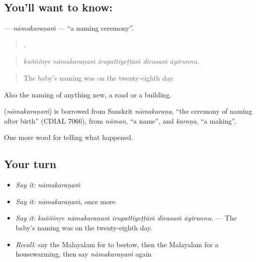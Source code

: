 \subsection*{You'll want to know: }
\textbf{} — \emph{nāmakaraṇaṁ} — \textquotedblleft{}a naming ceremony\textquotedblright{}.

\begin{quote}
    .
\end{quote}

\begin{quote}
\emph{kuññinṟe nāmakaraṇaṁ irupattiyeṭṭāṁ divasaṁ āyirunnu.}
\end{quote}

\begin{quote}
The baby's naming was on the twenty-eighth day.
\end{quote}

Also the naming of anything new, a road or a building.

\begin{cousinweb}
\textbf{} (\emph{nāmakaraṇaṁ}) is borrowed from Sanskrit \emph{nāmakaraṇa}, \textquotedblleft{}the ceremony of naming after birth\textquotedblright{} (CDIAL 7066), from \emph{nāman}, \textquotedblleft{}a name\textquotedblright{}, and \emph{karaṇa}, \textquotedblleft{}a making\textquotedblright{}.
\end{cousinweb}

\begin{grammarlens}[title={What you've built}]
One more word for telling what happened.
\end{grammarlens}

\subsection*{Your turn}
\begin{itemize}
\raggedright
  \item \emph{Say it:} \emph{nāmakaraṇaṁ}
  \item \emph{Say it:} \emph{nāmakaraṇaṁ}, once more
  \item \emph{Say it:} \emph{kuññinṟe nāmakaraṇaṁ irupattiyeṭṭāṁ divasaṁ āyirunnu.} — The baby's naming was on the twenty-eighth day.
  \item \emph{Recall:} say the Malayalam for to bestow, then the Malayalam for a housewarming, then say \emph{nāmakaraṇaṁ} again
\end{itemize}

